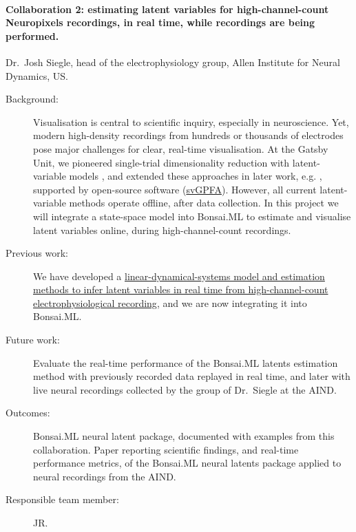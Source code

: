 \paragraph{Collaboration 2: estimating latent variables for high-channel-count
Neuropixels recordings, in real time, while recordings are being performed.}
Dr.~Josh Siegle, head of the electrophysiology group, Allen Institute for
Neural Dynamics, US.

\begin{description}

    \item[Background:] Visualisation is central to scientific inquiry,
        especially in neuroscience. Yet, modern high-density recordings from
        hundreds or thousands of electrodes pose major challenges for clear,
        real-time visualisation. At the Gatsby Unit, we pioneered single-trial
        dimensionality reduction with latent-variable models \citep{yuEtAl09},
        and extended these approaches in later work, e.g.
        \citep{dunckerAndSahani18}, supported by open-source software
        (\href{https://github.com/joacorapela/svGPFA}{svGPFA}). However, all
        current latent-variable methods operate offline, after data collection.
        In this project we will integrate a state-space model into Bonsai.ML to
        estimate and visualise latent variables online, during
        high-channel-count recordings.

    \item[Previous work:] We have developed a
        \href{https://joacorapela.github.io/ssm/auto_examples/neuralLatents/plot_MC_MAZE_SMALL.html#sphx-glr-auto-examples-neurallatents-plot-mc-maze-small-py}{linear-dynamical-systems
        model and estimation methods to infer latent variables in real time
        from high-channel-count electrophysiological recording}, and we are now
        integrating it into Bonsai.ML.


    \item[Future work:] Evaluate the real-time performance of the Bonsai.ML
        latents estimation method with previously recorded data replayed in
        real time, and later with live neural recordings collected by the group
        of Dr.~Siegle at the AIND.

    \item[Outcomes:] Bonsai.ML neural latent package, documented with examples
        from this collaboration. Paper reporting scientific findings, and
        real-time performance metrics, of the Bonsai.ML neural latents package
        applied to neural recordings from the AIND.

    \item[Responsible team member:] JR.

\end{description}

